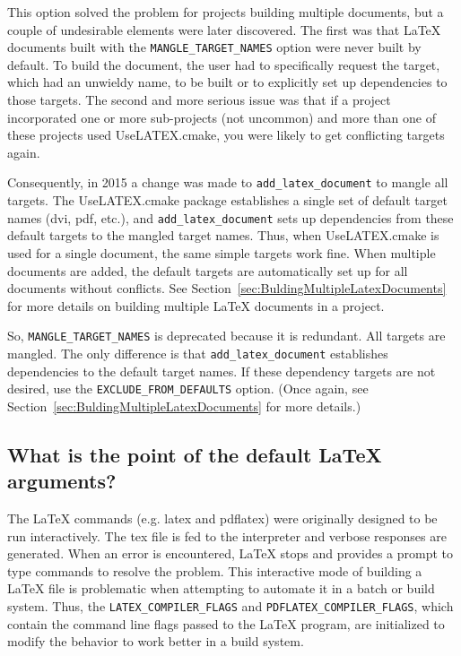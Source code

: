 \documentclass{article}
\newcommand*{\textfile}[1]{\textsf{#1}}
\newcommand*{\textprog}[1]{\textfile{#1}}
\newcommand*{\textcmake}[1]{\texttt{#1}}
\newcommand*{\textcmakevar}[1]{\textcmake{#1}}
\newcommand*{\textmaketarget}[1]{#1}
\newcommand*{\UseLATEX}{\textfile{UseLATEX.cmake}\xspace}
\newcommand*{\latex}{\LaTeX\xspace}
\newcommand*{\ald}{\textcmake{add\_latex\_document}\xspace}
\begin{document}
  This option solved the problem for projects building multiple documents,
  but a couple of undesirable elements were later discovered. The first was
  that \latex documents built with the \textcmake{MANGLE\_TARGET\_NAMES}
  option were never built by default. To build the document, the user had
  to specifically request the target, which had an unwieldy name, to be
  built or to explicitly set up dependencies to those targets. The second
  and more serious issue was that if a project incorporated one or more
  sub-projects (not uncommon) and more than one of these projects used
  \UseLATEX, you were likely to get conflicting targets again.

  Consequently, in 2015 a change was made to \ald to mangle all targets.
  The \UseLATEX package establishes a single set of default target names
  (\textmaketarget{dvi}, \textmaketarget{pdf}, etc.), and \ald sets up
  dependencies from these default targets to the mangled target names.
  Thus, when \UseLATEX is used for a single document, the same simple
  targets work fine. When multiple documents are added, the default targets
  are automatically set up for all documents without conflicts. See
  Section~\ref{sec:BuldingMultipleLatexDocuments} for more details on
  building multiple \latex documents in a project.

  So, \textcmake{MANGLE\_TARGET\_NAMES} is deprecated because it is
  redundant. All targets are mangled. The only difference is that \ald
  establishes dependencies to the default target names. If these dependency
  targets are not desired, use the \textcmake{EXCLUDE\_FROM\_DEFAULTS}
  option. (Once again, see Section~\ref{sec:BuldingMultipleLatexDocuments}
  for more details.)

  \subsection{What is the point of the default \latex arguments?}
  \label{sec:What_is_the_point_of_the_default_latex_arguments}

  The \latex commands (e.g. \textprog{latex} and \textprog{pdflatex}) were originally designed to be run interactively.
  The \textfile{tex} file is fed to the interpreter and verbose responses are generated.
  When an error is encountered, \latex stops and provides a prompt to type commands to resolve the problem.
  This interactive mode of building a \latex file is problematic when attempting to automate it in a batch or build system.
  Thus, the \textcmakevar{LATEX\_COMPILER\_FLAGS} and \textcmakevar{PDFLATEX\_COMPILER\_FLAGS}, which contain the command line flags passed to the \latex program, are initialized to modify the behavior to work better in a build system.
\end{document}
